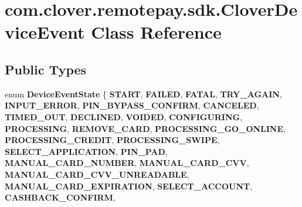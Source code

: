 \hypertarget{classcom_1_1clover_1_1remotepay_1_1sdk_1_1_clover_device_event}{}\section{com.\+clover.\+remotepay.\+sdk.\+Clover\+Device\+Event Class Reference}
\label{classcom_1_1clover_1_1remotepay_1_1sdk_1_1_clover_device_event}
\subsection*{Public Types}
\begin{DoxyCompactItemize}
\item 
\mbox{\label{classcom_1_1clover_1_1remotepay_1_1sdk_1_1_clover_device_event_a1c3d109490aaab4a0b8f40ceb990abe3}} 
enum {\bfseries Device\+Event\+State} \{ \newline
{\bfseries S\+T\+A\+RT}, 
{\bfseries F\+A\+I\+L\+ED}, 
{\bfseries F\+A\+T\+AL}, 
{\bfseries T\+R\+Y\+\_\+\+A\+G\+A\+IN}, 
\newline
{\bfseries I\+N\+P\+U\+T\+\_\+\+E\+R\+R\+OR}, 
{\bfseries P\+I\+N\+\_\+\+B\+Y\+P\+A\+S\+S\+\_\+\+C\+O\+N\+F\+I\+RM}, 
{\bfseries C\+A\+N\+C\+E\+L\+ED}, 
{\bfseries T\+I\+M\+E\+D\+\_\+\+O\+UT}, 
\newline
{\bfseries D\+E\+C\+L\+I\+N\+ED}, 
{\bfseries V\+O\+I\+D\+ED}, 
{\bfseries C\+O\+N\+F\+I\+G\+U\+R\+I\+NG}, 
{\bfseries P\+R\+O\+C\+E\+S\+S\+I\+NG}, 
\newline
{\bfseries R\+E\+M\+O\+V\+E\+\_\+\+C\+A\+RD}, 
{\bfseries P\+R\+O\+C\+E\+S\+S\+I\+N\+G\+\_\+\+G\+O\+\_\+\+O\+N\+L\+I\+NE}, 
{\bfseries P\+R\+O\+C\+E\+S\+S\+I\+N\+G\+\_\+\+C\+R\+E\+D\+IT}, 
{\bfseries P\+R\+O\+C\+E\+S\+S\+I\+N\+G\+\_\+\+S\+W\+I\+PE}, 
\newline
{\bfseries S\+E\+L\+E\+C\+T\+\_\+\+A\+P\+P\+L\+I\+C\+A\+T\+I\+ON}, 
{\bfseries P\+I\+N\+\_\+\+P\+AD}, 
{\bfseries M\+A\+N\+U\+A\+L\+\_\+\+C\+A\+R\+D\+\_\+\+N\+U\+M\+B\+ER}, 
{\bfseries M\+A\+N\+U\+A\+L\+\_\+\+C\+A\+R\+D\+\_\+\+C\+VV}, 
\newline
{\bfseries M\+A\+N\+U\+A\+L\+\_\+\+C\+A\+R\+D\+\_\+\+C\+V\+V\+\_\+\+U\+N\+R\+E\+A\+D\+A\+B\+LE}, 
{\bfseries M\+A\+N\+U\+A\+L\+\_\+\+C\+A\+R\+D\+\_\+\+E\+X\+P\+I\+R\+A\+T\+I\+ON}, 
{\bfseries S\+E\+L\+E\+C\+T\+\_\+\+A\+C\+C\+O\+U\+NT}, 
{\bfseries C\+A\+S\+H\+B\+A\+C\+K\+\_\+\+C\+O\+N\+F\+I\+RM}, 

\end{DoxyCompactItemize}
